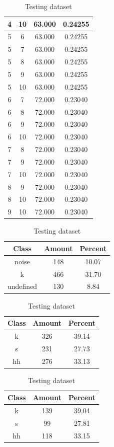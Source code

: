 \begin{table}
\begin{subtable}[h]{0.45\textwidth}
{\begin{tabular}{|c|c|c|c|}
 4 & 10 & 63.000 & 0.24255\\ \hline 
 5 & 6 & 63.000 & 0.24255\\ \hline 
 5 & 7 & 63.000 & 0.24255\\ \hline 
 5 & 8 & 63.000 & 0.24255\\ \hline 
 5 & 9 & 63.000 & 0.24255\\ \hline 
 5 & 10 & 63.000 & 0.24255\\ \hline 
 6 & 7 & 72.000 & 0.23040\\ \hline 
 6 & 8 & 72.000 & 0.23040\\ \hline 
 6 & 9 & 72.000 & 0.23040\\ \hline 
 6 & 10 & 72.000 & 0.23040\\ \hline 
 7 & 8 & 72.000 & 0.23040\\ \hline 
 7 & 9 & 72.000 & 0.23040\\ \hline 
 7 & 10 & 72.000 & 0.23040\\ \hline 
 8 & 9 & 72.000 & 0.23040\\ \hline 
 8 & 10 & 72.000 & 0.23040\\ \hline 
 9 & 10 & 72.000 & 0.23040\\ \hline 

\end{tabular}
}\caption{xcsflux52}\label{xlsflux52}

\end{subtable}

\begin{subtable}[h]{0.45\textwidth}
\centering
\begin{tabular}{|c|c|c|}
\hline
Class & Amount & Percent\\ \hline
noise & 148 & 10.07\\ \hline
k & 466 & 31.70\\ \hline
undefined & 130 & 8.84\\ \hline
\end{tabular}
\caption{Entire dataset after stripping short sounds}
\end{subtable}
\hfill
\begin{subtable}[h]{0.45\textwidth}
\centering
\begin{tabular}{|c|c|c|}
\hline
Class & Amount & Percent\\ \hline
k & 326 & 39.14\\ \hline
s & 231 & 27.73\\ \hline
hh & 276 & 33.13\\ \hline
\end{tabular}
\caption{Training dataset}
\end{subtable}
\hfill
\begin{subtable}[h]{0.45\textwidth}
\centering
\begin{tabular}{|c|c|c|}
\hline
Class & Amount & Percent\\ \hline
k & 139 & 39.04\\ \hline
s & 99 & 27.81\\ \hline
hh & 118 & 33.15\\ \hline
\end{tabular}
\caption{Testing dataset}
\end{subtable}
\hfill



\end{table}
